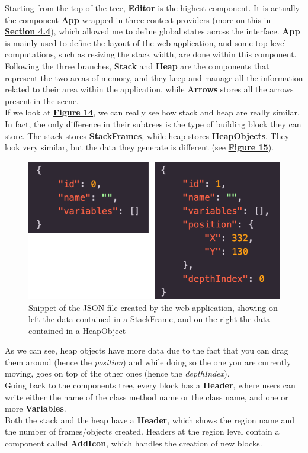 \documentclass[]{usiinfbachelorproject}
\begin{document}
\bigskip

\noindent Starting from the top of the tree, \textbf{Editor} is the highest component. It is actually the component \textbf{App} wrapped in three context providers (more on this in \hyperref[storing states]{\textbf{Section 4.4}}), which allowed me to define global states across the interface. \textbf{App} is mainly used to define the layout of the web application, and some top-level computations, such as resizing the stack width, are done within this component.\\
Following the three branches, \textbf{Stack} and \textbf{Heap} are the components that represent the two areas of memory, and they keep and manage all the information related to their area within the application, while \textbf{Arrows} stores all the arrows present in the scene.\\
If we look at \textbf{\hyperref[tree]{Figure 14}}, we can really see how stack and heap are really similar. In fact, the only difference in their subtrees is the type of building block they can store. The stack stores \textbf{StackFrames}, while heap stores \textbf{HeapObjects}. They look very similar, but the data they generate is different (see \hyperref[json]{\textbf{Figure 15}}).\\

\begin{figure}[h!]
\centering
\includegraphics[scale=.3]{figures/blocks_data.png}
\caption {Snippet of the JSON file created by the web application, showing on left the data contained in a StackFrame, and on the right the data contained in a HeapObject}
\label{json}
\end{figure}

\noindent As we can see, heap objects have more data due to the fact that you can drag them around (hence the \emph{position}) and while doing so the one you are currently moving, goes on top of the other ones (hence the \emph{depthIndex}).\\
Going back to the components tree, every block has a \textbf{Header}, where users can write either the name of the class method name or the class name, and one or more \textbf{Variables}.\\
Both the stack and the heap have a \textbf{Header}, which shows the region name and the number of frames/objects created. Headers at the region level contain a component called \textbf{AddIcon}, which handles the creation of new blocks.
\end{document}
